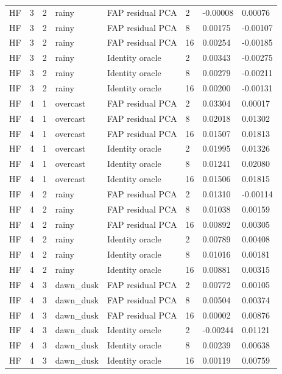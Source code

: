 \begin{tabular}{llllllll}
HF & 3 & 2 & rainy & FAP residual PCA & 2 & -0.00008 & 0.00076 \\
HF & 3 & 2 & rainy & FAP residual PCA & 8 & 0.00175 & -0.00107 \\
HF & 3 & 2 & rainy & FAP residual PCA & 16 & 0.00254 & -0.00185 \\
HF & 3 & 2 & rainy & Identity oracle & 2 & 0.00343 & -0.00275 \\
HF & 3 & 2 & rainy & Identity oracle & 8 & 0.00279 & -0.00211 \\
HF & 3 & 2 & rainy & Identity oracle & 16 & 0.00200 & -0.00131 \\
HF & 4 & 1 & overcast & FAP residual PCA & 2 & 0.03304 & 0.00017 \\
HF & 4 & 1 & overcast & FAP residual PCA & 8 & 0.02018 & 0.01302 \\
HF & 4 & 1 & overcast & FAP residual PCA & 16 & 0.01507 & 0.01813 \\
HF & 4 & 1 & overcast & Identity oracle & 2 & 0.01995 & 0.01326 \\
HF & 4 & 1 & overcast & Identity oracle & 8 & 0.01241 & 0.02080 \\
HF & 4 & 1 & overcast & Identity oracle & 16 & 0.01506 & 0.01815 \\
HF & 4 & 2 & rainy & FAP residual PCA & 2 & 0.01310 & -0.00114 \\
HF & 4 & 2 & rainy & FAP residual PCA & 8 & 0.01038 & 0.00159 \\
HF & 4 & 2 & rainy & FAP residual PCA & 16 & 0.00892 & 0.00305 \\
HF & 4 & 2 & rainy & Identity oracle & 2 & 0.00789 & 0.00408 \\
HF & 4 & 2 & rainy & Identity oracle & 8 & 0.01016 & 0.00181 \\
HF & 4 & 2 & rainy & Identity oracle & 16 & 0.00881 & 0.00315 \\
HF & 4 & 3 & dawn\_dusk & FAP residual PCA & 2 & 0.00772 & 0.00105 \\
HF & 4 & 3 & dawn\_dusk & FAP residual PCA & 8 & 0.00504 & 0.00374 \\
HF & 4 & 3 & dawn\_dusk & FAP residual PCA & 16 & 0.00002 & 0.00876 \\
HF & 4 & 3 & dawn\_dusk & Identity oracle & 2 & -0.00244 & 0.01121 \\
HF & 4 & 3 & dawn\_dusk & Identity oracle & 8 & 0.00239 & 0.00638 \\
HF & 4 & 3 & dawn\_dusk & Identity oracle & 16 & 0.00119 & 0.00759 \\
\bottomrule
\end{tabular}
